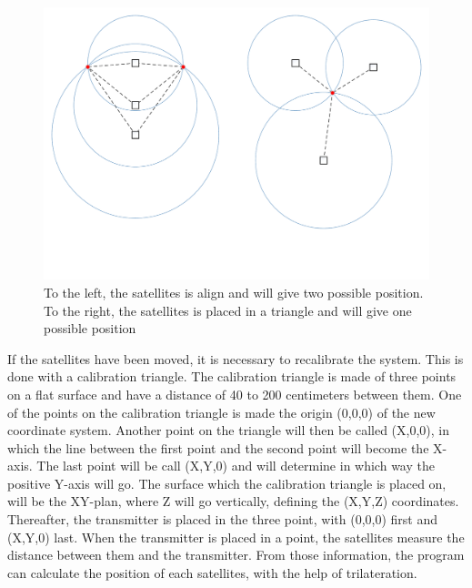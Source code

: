 \begin{figure}[H]
	\centering
	\includegraphics[scale=0.5]{figures/GoT_SingleVsTriangle.pdf}
	\caption{To the left, the satellites is align and will give two possible position. To the right, the satellites is placed in a triangle and will give one possible position}
	\label{GoTTriVSLine}
\end{figure}

If the satellites have been moved, it is necessary to recalibrate the system. This is done with a calibration triangle. The calibration triangle is made of three points on a flat surface and have a distance of 40 to 200 centimeters between them. One of the points on the calibration triangle is made the origin (0,0,0) of the new coordinate system. Another point on the triangle will then be called (X,0,0), in which the line between the first point and the second point will become the X-axis. The last point will be call (X,Y,0) and will determine in which way the positive Y-axis will go. The surface which the calibration triangle is placed on, will be the XY-plan, where Z will go vertically, defining the (X,Y,Z) coordinates. Thereafter, the transmitter is placed in the three point, with (0,0,0) first and (X,Y,0) last. When the transmitter is placed in a point, the satellites measure the distance between them and the transmitter. From those information, the program can calculate the position of each satellites, with the help of trilateration. \\\\
